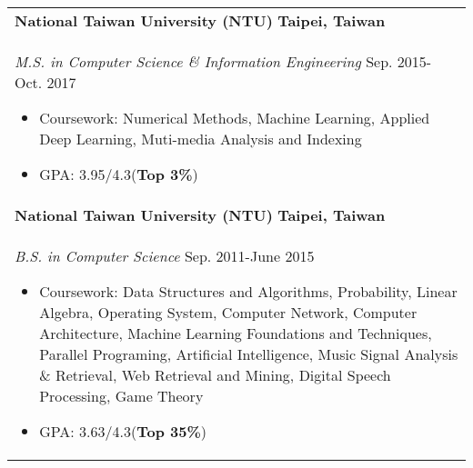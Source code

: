 \documentclass[a4paper,11pt]{article} %
\begin{document}
\begin{tabular}{p{18.5cm}}
{\bf{National Taiwan University (NTU)}}  \hfill \bf{Taipei, Taiwan}\\
{\it M.S. in Computer Science \& Information Engineering} \hfill  Sep. 2015-Oct. 2017
\begin{itemize}
\item Coursework: Numerical Methods, Machine Learning, Applied Deep Learning, Muti-media Analysis and Indexing
\item GPA: 3.95/4.3(\textbf{Top 3\%})\vspace*{-\baselineskip}
\end{itemize}\\ 

{\bf{National Taiwan University (NTU)}} \hfill \bf{Taipei, Taiwan}\\
{\it B.S. in Computer Science} \hfill Sep. 2011-June 2015
\begin{itemize}
\item Coursework: Data Structures and Algorithms, Probability, Linear Algebra, Operating System, Computer Network, Computer Architecture, Machine Learning Foundations and Techniques, Parallel Programing, Artificial Intelligence, Music Signal Analysis \& Retrieval, Web Retrieval and Mining, Digital Speech Processing, Game Theory
\item GPA: 3.63/4.3(\textbf{Top 35\%})
\end{itemize} \\
\end{tabular}
\vspace*{-\baselineskip}
\end{document}
